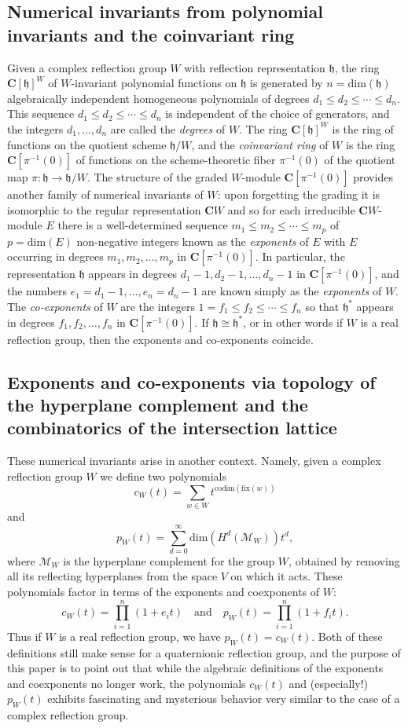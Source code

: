 \documentclass[11pt, reqno]{amsart}
\numberwithin{equation}{section}
\theoremstyle{definition}
\theoremstyle{plain}
\newcommand{\CC}{\mathbf{C}}
\newcommand{\hh}{\mathfrak{h}}
\begin{document}
\subsection{Numerical invariants from polynomial invariants and the coinvariant ring} Given a complex reflection group $W$ with reflection representation $\hh$, the ring $\CC[\hh]^W$ of $W$-invariant polynomial functions on $\hh$ is generated by $n=\mathrm{dim}(\hh)$ algebraically independent homogeneous polynomials of degrees $d_1 \leq d_2 \leq \cdots \leq d_n$. This sequence $d_1 \leq d_2 \leq \cdots \leq d_n$ is independent of the choice of generators, and the integers $d_1,\dots,d_n$ are called the \emph{degrees} of $W$. The ring $\CC[\hh]^W$ is the ring of functions on the quotient scheme $\hh/W$, and the \emph{coinvariant ring} of $W$ is the ring $\CC[\pi^{-1}(0)]$ of functions on the scheme-theoretic fiber $\pi^{-1}(0)$ of the quotient map $\pi: \hh \to \hh/W$. The structure of the graded $W$-module $\CC[\pi^{-1}(0)]$ provides another family of numerical invariants of $W$: upon forgetting the grading it is isomorphic to the regular representation $\CC W$ and so for each irreducible $\CC W$-module $E$ there is a well-determined sequence $m_1 \leq m_2 \leq \cdots \leq m_p$ of $p=\mathrm{dim}(E)$ non-negative integers known as the \emph{exponents} of $E$ with $E$ occurring in degrees $m_1, m_2,\dots,m_p$ in $\CC[\pi^{-1}(0)]$. In particular, the representation $\hh$ appears in degrees $d_1-1,d_2-1,\dots,d_n-1$ in $\CC[\pi^{-1}(0)]$, and the numbers $e_1=d_1-1,\dots,e_n=d_n-1$ are known simply as the \emph{exponents} of $W$. The \emph{co-exponents} of $W$ are the integers $1=f_1 \leq f_2 \leq \cdots \leq f_n$ so that $\hh^*$ appears in degrees $f_1,f_2,\dots,f_n$ in $\CC[\pi^{-1}(0)]$. If $\hh \cong \hh^*$, or in other words if $W$ is a real reflection group, then the exponents and co-exponents coincide.

\subsection{Exponents and co-exponents via topology of the hyperplane complement and the combinatorics of the intersection lattice} These numerical invariants arise in another context. Namely, given a complex reflection group $W$ we define two polynomials
$$c_W(t)=\sum_{w \in W} t^{\mathrm{codim}(\mathrm{fix}(w))}$$ and
$$p_W(t)=\sum_{d=0}^\infty \mathrm{dim}(H^d(\mathcal{M}_W)) t^d,$$ where $\mathcal{M}_W$ is the hyperplane complement for the group $W$, obtained by removing all its reflecting hyperplanes from the space $V$ on which it acts. These polynomials factor in terms of the exponents and coexponents of $W$:
$$c_W(t)=\prod_{i=1}^n (1+e_i t) \quad \text{and} \quad p_W(t)=\prod_{i=1}^n (1+f_i t).$$ Thus if $W$ is a real reflection group, we have $p_W(t)=c_W(t)$. Both of these definitions still make sense for a quaternionic reflection group, and the purpose of this paper is to point out that while the algebraic definitions of the exponents and coexponents no longer work, the polynomials $c_W(t)$ and (especially!) $p_W(t)$ exhibits fascinating and mysterious behavior very similar to the case of a complex reflection group.  
\end{document}
